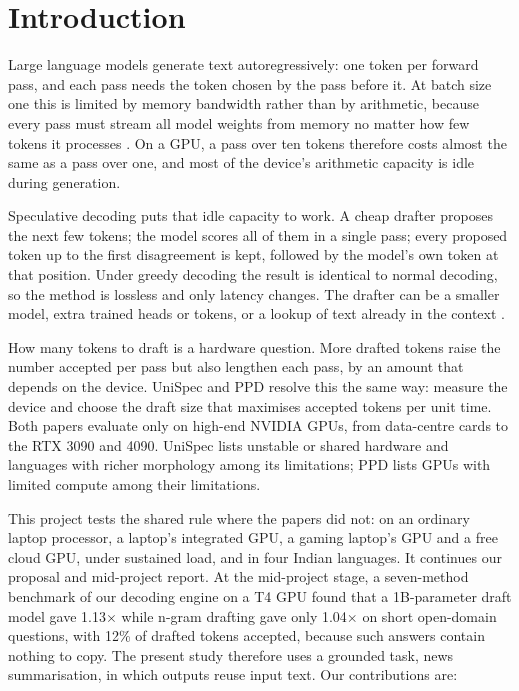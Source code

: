 \documentclass[11pt,a4paper]{article}
\begin{document}
\section{Introduction}
Large language models generate text autoregressively: one token per forward pass, and each pass needs the token chosen by the pass before it. At batch size one this is limited by memory bandwidth rather than by arithmetic, because every pass must stream all model weights from memory no matter how few tokens it processes \cite{roofline,vllm}. On a GPU, a pass over ten tokens therefore costs almost the same as a pass over one, and most of the device's arithmetic capacity is idle during generation.

Speculative decoding \cite{leviathan,chen} puts that idle capacity to work. A cheap drafter proposes the next few tokens; the model scores all of them in a single pass; every proposed token up to the first disagreement is kept, followed by the model's own token at that position. Under greedy decoding the result is identical to normal decoding, so the method is lossless and only latency changes. The drafter can be a smaller model, extra trained heads or tokens, or a lookup of text already in the context \cite{medusa,eagle,lookahead,pld,rest}.

How many tokens to draft is a hardware question. More drafted tokens raise the number accepted per pass but also lengthen each pass, by an amount that depends on the device. UniSpec \cite{unispec} and PPD \cite{ppd} resolve this the same way: measure the device and choose the draft size that maximises accepted tokens per unit time. Both papers evaluate only on high-end NVIDIA GPUs, from data-centre cards to the RTX 3090 and 4090. UniSpec lists unstable or shared hardware and languages with richer morphology among its limitations; PPD lists GPUs with limited compute among their limitations.

This project tests the shared rule where the papers did not: on an ordinary laptop processor, a laptop's integrated GPU, a gaming laptop's GPU and a free cloud GPU, under sustained load, and in four Indian languages. It continues our proposal and mid-project report. At the mid-project stage, a seven-method benchmark of our decoding engine on a T4 GPU found that a 1B-parameter draft model gave 1.13$\times$ while n-gram drafting gave only 1.04$\times$ on short open-domain questions, with 12\% of drafted tokens accepted, because such answers contain nothing to copy. The present study therefore uses a grounded task, news summarisation, in which outputs reuse input text. Our contributions are:
\end{document}
